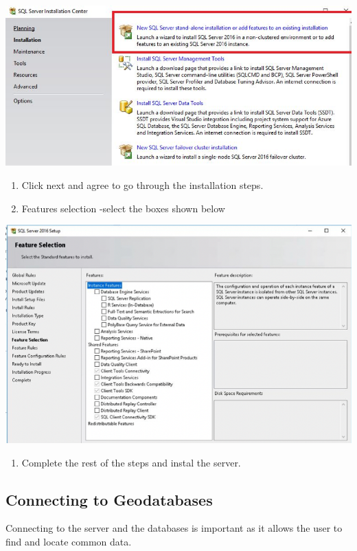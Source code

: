 \documentclass[]{book}
\providecommand{\tightlist}{%
  \setlength{\itemsep}{0pt}\setlength{\parskip}{0pt}}
\theoremstyle{definition}
\theoremstyle{definition}
\theoremstyle{definition}
\theoremstyle{remark}
\begin{document}
\begin{center}\includegraphics[width=0.7\linewidth]{img/fig43_arcgis3} \end{center}

\begin{enumerate}
\def\labelenumi{\arabic{enumi}.}
\setcounter{enumi}{3}
\tightlist
\item
  Click next and agree to go through the installation steps.
\item
  Features selection -select the boxes shown below
\end{enumerate}

\begin{center}\includegraphics[width=0.7\linewidth]{img/fig43_arcgis4} \end{center}

\begin{enumerate}
\def\labelenumi{\arabic{enumi}.}
\setcounter{enumi}{5}
\tightlist
\item
  Complete the rest of the steps and instal the server.
\end{enumerate}

\subsection{Connecting to
Geodatabases}\label{connecting-to-geodatabases}

Connecting to the server and the databases is important as it allows the
user to find and locate common data.
\end{document}
